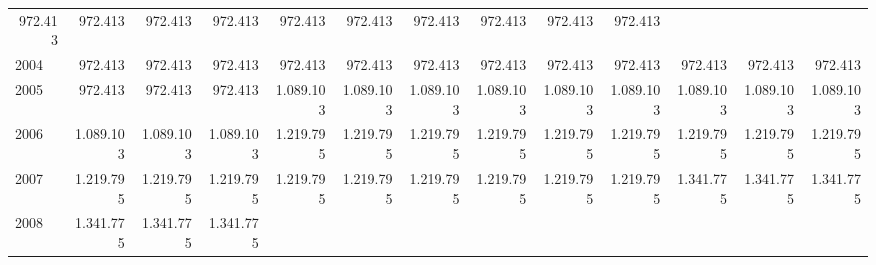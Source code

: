 \begin{tabular}{lllllllllllll}
  \multicolumn{1}{r}{972.413} &
  \multicolumn{1}{r}{972.413} &
  \multicolumn{1}{r}{972.413} &
  \multicolumn{1}{r}{972.413} &
  \multicolumn{1}{r}{972.413} &
  \multicolumn{1}{r}{972.413} &
  \multicolumn{1}{r}{972.413} &
  \multicolumn{1}{r}{972.413} &
  \multicolumn{1}{r}{972.413} &
  \multicolumn{1}{r}{972.413} \\
\multicolumn{1}{l}{\hspace{1em}2004} &
  \multicolumn{1}{|r}{972.413} &
  \multicolumn{1}{r}{972.413} &
  \multicolumn{1}{r}{972.413} &
  \multicolumn{1}{r}{972.413} &
  \multicolumn{1}{r}{972.413} &
  \multicolumn{1}{r}{972.413} &
  \multicolumn{1}{r}{972.413} &
  \multicolumn{1}{r}{972.413} &
  \multicolumn{1}{r}{972.413} &
  \multicolumn{1}{r}{972.413} &
  \multicolumn{1}{r}{972.413} &
  \multicolumn{1}{r}{972.413} \\
\multicolumn{1}{l}{\hspace{1em}2005} &
  \multicolumn{1}{|r}{972.413} &
  \multicolumn{1}{r}{972.413} &
  \multicolumn{1}{r}{972.413} &
  \multicolumn{1}{r}{1.089.103} &
  \multicolumn{1}{r}{1.089.103} &
  \multicolumn{1}{r}{1.089.103} &
  \multicolumn{1}{r}{1.089.103} &
  \multicolumn{1}{r}{1.089.103} &
  \multicolumn{1}{r}{1.089.103} &
  \multicolumn{1}{r}{1.089.103} &
  \multicolumn{1}{r}{1.089.103} &
  \multicolumn{1}{r}{1.089.103} \\
\multicolumn{1}{l}{\hspace{1em}2006} &
  \multicolumn{1}{|r}{1.089.103} &
  \multicolumn{1}{r}{1.089.103} &
  \multicolumn{1}{r}{1.089.103} &
  \multicolumn{1}{r}{1.219.795} &
  \multicolumn{1}{r}{1.219.795} &
  \multicolumn{1}{r}{1.219.795} &
  \multicolumn{1}{r}{1.219.795} &
  \multicolumn{1}{r}{1.219.795} &
  \multicolumn{1}{r}{1.219.795} &
  \multicolumn{1}{r}{1.219.795} &
  \multicolumn{1}{r}{1.219.795} &
  \multicolumn{1}{r}{1.219.795} \\
\multicolumn{1}{l}{\hspace{1em}2007} &
  \multicolumn{1}{|r}{1.219.795} &
  \multicolumn{1}{r}{1.219.795} &
  \multicolumn{1}{r}{1.219.795} &
  \multicolumn{1}{r}{1.219.795} &
  \multicolumn{1}{r}{1.219.795} &
  \multicolumn{1}{r}{1.219.795} &
  \multicolumn{1}{r}{1.219.795} &
  \multicolumn{1}{r}{1.219.795} &
  \multicolumn{1}{r}{1.219.795} &
  \multicolumn{1}{r}{1.341.775} &
  \multicolumn{1}{r}{1.341.775} &
  \multicolumn{1}{r}{1.341.775} \\
\multicolumn{1}{l}{\hspace{1em}2008} &
  \multicolumn{1}{|r}{1.341.775} &
  \multicolumn{1}{r}{1.341.775} &
  \multicolumn{1}{r}{1.341.775} &

\end{tabular}
